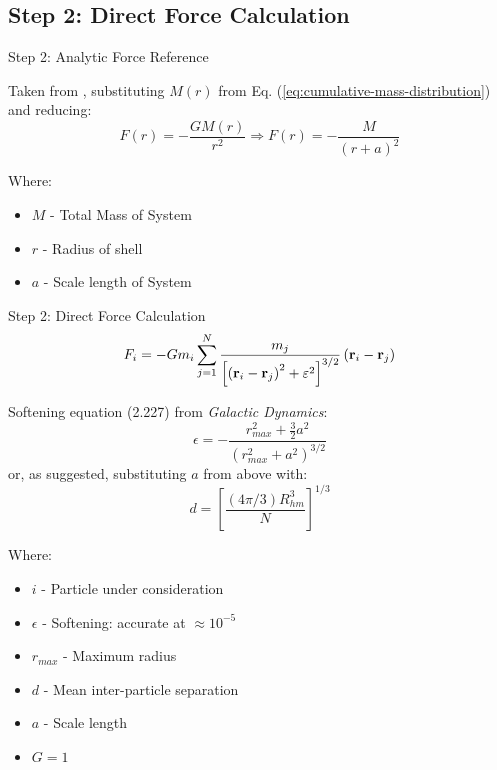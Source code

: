 \subsection{Step 2: Direct Force Calculation}
\begin{frame}{Step 2: Analytic Force Reference}

	Taken from \cite{2008gady}, substituting $M(r)$ from Eq. (\ref{eq:cumulative-mass-distribution}) and
	reducing:
	\begin{equation}
		F(r) = - \frac{GM(r)}{r^2} \Rightarrow F(r) = - \frac{M}{(r+a)^2}
		\label{eq:newton-force}
	\end{equation}

	{\footnotesize Where:
	\begin{itemize}
		\item $M$ - Total Mass of System
		\item $r$ - Radius of shell
		\item $a$ - Scale length of System
	\end{itemize}}
\end{frame}

\begin{frame}{Step 2: Direct Force Calculation}
	\begin{equation}
		F_i=-G m_i \sum_{j=1}^N \frac{m_j}{\left[\left(\vb{r}_i-\vb{r}_j\right)^2+\varepsilon^2\right]^{3 /
				2}}\left(\vb{r}_i-\vb{r}_j\right)
		\label{eq:direct-force-full}
	\end{equation}


	Softening equation (2.227) from \textit{Galactic Dynamics}:
	\begin{equation}
		\epsilon=-\frac{r_{max}^2+\frac{3}{2} a^2}{\left(r_{max}^2+a^2\right)^{3 / 2}}
		\label{eq:softening}
	\end{equation}
	or, as suggested, substituting $a$ from above with:
	\begin{equation}
		d=\left[\frac{(4 \pi / 3) R_{hm}^3}{N}\right]^{1 / 3}
	\end{equation}

	{\footnotesize Where:
	\begin{itemize}
		\item $i$ - Particle under consideration
		\item $\epsilon$ - Softening: accurate at $\approx 10^{-5}$
		\item $r_{max}$ - Maximum radius
		\item $d$ - Mean inter-particle separation
		\item $a$ - Scale length
		\item $G=1$
	\end{itemize}
	}
\end{frame}

